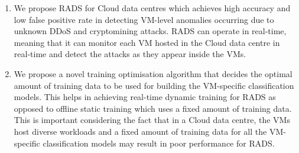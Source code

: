 \begin{enumerate}[{(1)}]
\item We propose RADS for Cloud data centres which achieves high accuracy and low false positive rate in detecting VM-level anomalies occurring due to unknown DDoS and cryptomining attacks. RADS can operate in real-time, meaning that it can monitor each VM hosted in the Cloud data centre in real-time and detect the attacks as they appear inside the VMs.
\item We propose a novel training optimisation algorithm that decides the optimal amount of training data to be used for building the VM-specific classification models. This helps in achieving real-time dynamic training for RADS as opposed to offline static training which uses a fixed amount of training data. This is important considering the fact that in a Cloud data centre, the VMs host diverse workloads and a fixed amount of training data for all the VM-specific classification models may result in poor performance for RADS.

\end{enumerate}
